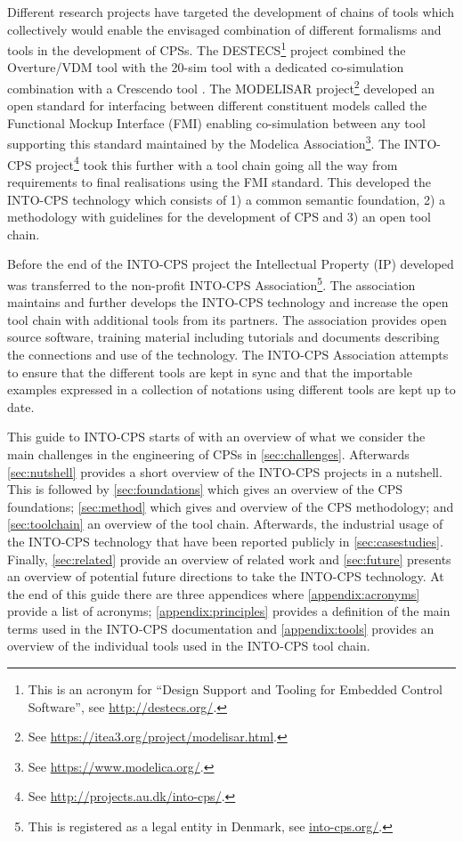 Different research projects have targeted the development of chains of tools which collectively would enable the envisaged combination of different formalisms and tools in the development of CPSs. The DESTECS\footnote{This is an acronym for ``Design Support and Tooling for Embedded Control Software'', see \url{http://destecs.org/}.} project \cite{Broenink&10} combined the Overture/VDM tool \cite{Larsen&10a} with the 20-sim tool \cite{Kleijn06} with a dedicated co-simulation combination with a Crescendo tool \cite{Fitzgerald&14c}. The MODELISAR project\footnote{See \url{https://itea3.org/project/modelisar.html}.} developed an open standard for interfacing between different constituent models called the Functional Mockup Interface (FMI) enabling co-simulation between any tool supporting this standard maintained by the Modelica Association\footnote{See \url{https://www.modelica.org/}.}. The INTO-CPS project\footnote{See \url{http://projects.au.dk/into-cps/}.} took this further with a tool chain going all the way from requirements to final realisations using the FMI standard. This developed the INTO-CPS technology which consists of 1) a common semantic foundation, 2) a methodology with guidelines for the development of CPS and 3) an open tool chain.

Before the end of the INTO-CPS project the Intellectual Property (IP) developed was transferred to the non-profit INTO-CPS Association\footnote{This is registered as a legal entity in Denmark, see \url{into-cps.org/}.}. The association maintains and further develops the INTO-CPS technology and increase the open tool chain with additional tools from its partners. The association provides open source software, training material including tutorials and documents describing the connections and use of the technology. The INTO-CPS Association attempts to ensure that the different tools are kept in sync and that the importable examples expressed in a collection of notations using different tools are kept up to date.

This guide to INTO-CPS starts of with an overview of what we consider the main challenges in the engineering of CPSs in \autoref{sec:challenges}. Afterwards \autoref{sec:nutshell} provides a short overview of the INTO-CPS projects in a nutshell. This is followed by \autoref{sec:foundations} which gives an overview of the CPS foundations; \autoref{sec:method} which gives and overview of the CPS methodology; and \autoref{sec:toolchain} an overview of the tool chain. Afterwards, the industrial usage of the INTO-CPS technology that have been reported publicly in \autoref{sec:casestudies}. Finally, \autoref{sec:related} provide an overview of related work and \autoref{sec:future} presents an overview of potential future directions to take the INTO-CPS technology. At the end of this guide there are three appendices where \autoref{appendix:acronyms} provide a list of acronyms; \autoref{appendix:principles} provides a definition of the main terms used in the INTO-CPS documentation and \autoref{appendix:tools} provides an overview of the individual tools used in the INTO-CPS tool chain.

